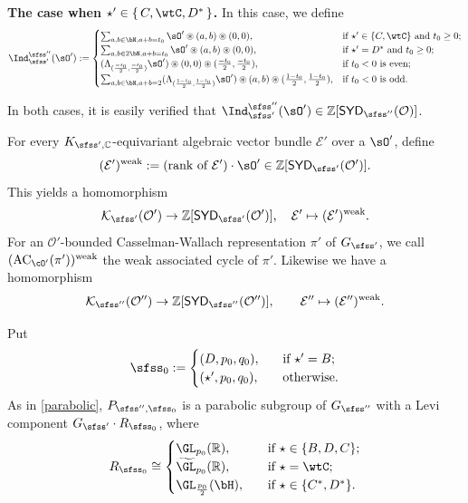 \documentclass[11pt,a4paper]{amsart}
\newcommand{\AC}{\mathrm{AC}}
\def\SYD{{\mathsf{SYD}}}
\newcommand{\CE}{{\mathcal {E}}}
\newcommand{\CK}{{\mathcal {K}}}
\newcommand{\CO}{{\mathcal {O}}}
\newcommand{\Z}{\mathbb{Z}}
\newcommand{\R}{\mathbb R}
\numberwithin{equation}{section}
\theoremstyle{remark}
\def\SYD{{\mathsf{SYD}}}
\def\AC{\mathrm{AC}}
\begin{document}
{\bf The case when  $\star' \in \set{C,\wtC, D^{*}}$.}
In this case, we define
\[
      \Ind_{\sfss'}^{\sfss''}(\sOp) :=
      \begin{cases}
        \sum_{a, b\in \bN, a+b=t_0}\sOp\circledast (a,b)\circledast (0,0),
           & \text{if $\star'\in \{C,\wtC\}$ and $t_0\geq 0$}; \\
            \sum_{a, b\in 2 \bN, a+b=t_0}\sOp\circledast (a,b)\circledast (0,0),
           & \text{if $\star'=D^*$ and $t_0\geq 0$}; \\
        (\Lambda_{(\frac{-t_0}{2},\frac{-t_0}{2})}\sOp) \circledast (0,0)
        \circledast (\frac{-t_0}{2},\frac{-t_0}{2}),
         & \text{if $t_0 < 0$ is even};  \\
        \sum_{a,b\in \bN, a+b = 2}(\Lambda_{(\frac{1-t_0}{2},\frac{1-t_0}{2})}\sOp)
        \circledast (a,b) \circledast (\frac{1-t_0}{2},\frac{1-t_0}{2}),
            & \text{if $t_0<0$ is odd}.
      \end{cases}
   \]

In both cases, it is easily verified that  $\Ind_{\sfss'}^{\sfss''}(\sOp)\in \Z[\SYD_{\sfss''}(\CO)]$.


\smallskip
\smallskip

For every   $K_{\sfss',\C}$-equivariant algebraic vector bundle $\CE'$ over a $\sO'$, define
\[
   (\CE')^{\mathrm{weak}}:=\textrm{(rank of $\CE'$)}\cdot \sO'\in \Z[\SYD_{\sfss'}(\CO')].
\]
This yields a homomorphism
\[
  \CK_{\sfss'}(\CO')\rightarrow \Z[\SYD_{\sfss'}(\CO')], \quad \CE'\mapsto (\CE')^{\mathrm{weak}}.
\]
For an $\CO'$-bounded Casselman-Wallach representation $\pi '$ of $G_{\sfss'}$,
we call $(\AC_{\cO'}(\pi'))^{\mathrm{weak}}$ the weak associated cycle of $\pi'$. Likewise we have a homomorphism
\[
  \CK_{\sfss''}(\CO'')\rightarrow \Z[\SYD_{\sfss''}(\CO'')], \qquad \CE''\mapsto (\CE'')^{\mathrm{weak}}.
\]



Put
\[
  \sfss_0 :=
  \begin{cases}
     (D, p_0,q_0),& \textrm{if $\star'=B$};\\
     (\star',p_0,q_0),\quad & \textrm{otherwise}.
  \end{cases}
\]
As in
\eqref{parabolic},
  $P_{\sfss'',\sfss_0}$ is a parabolic subgroup of $G_{\sfss''}$ with a Levi component $G_{\sfss'}\cdot R_{\sfss_0} $, where
\[
  R_{\sfss_0} \cong
  \begin{cases}
     \GL_{p_0}(\R),\quad & \textrm{if $\star\in \{B,D,C\}$};\\
     \widetilde \GL_{p_0}(\R),\quad & \textrm{if $\star=\wtC$};\\
     \GL_{\frac{p_0}{2}}(\bH),\quad & \textrm{if $\star\in \{C^*,D^*\}$}.
  \end{cases}
\]
\end{document}
